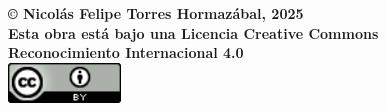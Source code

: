 \begin{titlepage}
  \vspace*{\fill}

  \begin{flushleft}
    {\fontsize{12}{14}\selectfont
    \textbf{
      © Nicolás Felipe Torres Hormazábal, 2025 \\[0.3cm]
      Esta obra está bajo una Licencia Creative Commons \\[0.3cm]
      Reconocimiento Internacional 4.0
    } \\[0.5cm]
    \includegraphics[width=3cm]{archivos/logo_cc.png}
    }
  \end{flushleft}

  \vspace*{0.5cm}
\end{titlepage}

